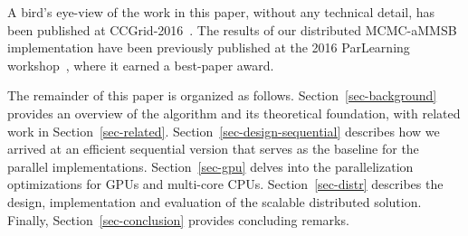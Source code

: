 \begin{comment}
Further, by cataloguing and accounting for the various load and store
operations, we identified the highest priority locations of data reuse. In
order to circumvent the unclear optimization landscape, we developed an
effective kernel code generation mechanism that explores the benefits of
exploiting all permutations of the available optimization opportunities. These
optimizations include caching in shared memory, caching in the register file,
loop unrolling and explicit vectorization.
\end{comment}

A bird's eye-view of the work in this paper, without any technical detail, has been
published at CCGrid-2016~\cite{10.1109/CCGrid.2016.98}.
The results of our distributed MCMC-aMMSB implementation
have been previously published at the 2016 ParLearning
workshop~\cite{DBLP:conf/ipps/El-HelwHLAWB16}, where it earned a best-paper
award.

The remainder of this paper is organized as follows.
Section~\ref{sec-background} provides an overview of the
algorithm and its theoretical foundation, with related work in
Section~\ref{sec-related}. Section~\ref{sec-design-sequential} describes how we
arrived at an efficient sequential version that serves as the baseline for the
parallel implementations. Section~\ref{sec-gpu} delves
into the parallelization optimizations for GPUs and multi-core CPUs.
Section~\ref{sec-distr} describes the design, implementation and evaluation of
the scalable distributed solution. Finally, Section~\ref{sec-conclusion}
provides concluding remarks.






